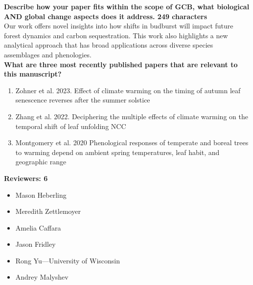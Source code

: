 \documentclass{letter}
\begin{document}
\textbf{Describe how your paper fits within the scope of GCB, what biological AND global change aspects does it address. 249 characters}\\

Our work offers novel insights into how shifts in budburst will impact future forest dynamics and carbon sequestration. This work also highlights a new analytical approach that has broad applications across diverse species assemblages and phenologies.\\

\textbf{What are three most recently published papers that are relevant to this manuscript?}\\ %
\begin{enumerate}
\item Zohner et al. 2023. Effect of climate warming on the timing of autumn leaf senescence reverses after the summer solstice\\
\item Zhang et al. 2022. Deciphering the multiple effects of climate warming on the temporal shift of leaf unfolding NCC\\
\item Montgomery et al. 2020 Phenological responses of temperate and boreal trees to warming depend on ambient spring temperatures, leaf habit, and geographic range
\end{enumerate}

\textbf{Reviewers: 6}
\begin{itemize}
\item Mason Heberling 
\item Meredith Zettlemoyer
\item Amelia Caffara
\item Jason Fridley 
\item Rong Yu---University of Wisconsin 
\item Andrey Malyshev
\end{itemize}




\end{document}
